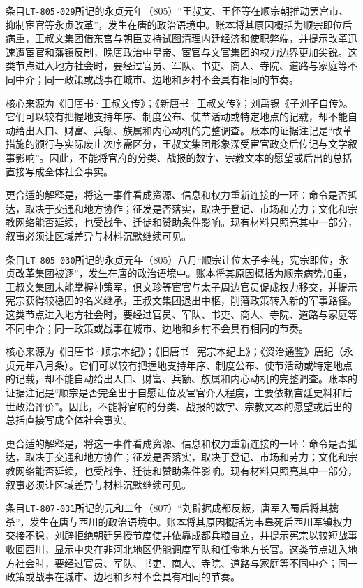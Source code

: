 条目\texttt{LT-805-029}所记的永贞元年（805）“王叔文、王伾等在顺宗朝推动罢宫市、抑制宦官等永贞改革”，发生在唐的政治语境中。账本将其原因概括为顺宗即位后病重，王叔文集团借东宫与朝臣支持试图清理内廷经济和使职弊端，并提示改革迅速遭宦官和藩镇反制，晚唐政治中皇帝、宦官与文官集团的权力边界更加尖锐。这类节点进入地方社会时，要经过官员、军队、书吏、商人、寺院、道路与家庭等不同中介；同一政策或战事在城市、边地和乡村不会具有相同的节奏。

核心来源为《旧唐书·王叔文传》；《新唐书·王叔文传》；刘禹锡《子刘子自传》。它们可以较有把握地支持年序、制度公布、使节活动或特定地点的记载，却不能自动给出人口、财富、兵额、族属和内心动机的完整调查。账本的证据注记是“改革措施的颁行与实际废止次序需区分，王叔文集团形象深受宦官政变后传记与文学叙事影响”。因此，不能将官府的分类、战报的数字、宗教文本的愿望或后出的总括直接写成全体社会事实。

更合适的解释是，将这一事件看成资源、信息和权力重新连接的一环：命令是否抵达，取决于交通和地方协作；征发是否落实，取决于登记、市场和劳力；文化和宗教网络能否延续，也受战争、迁徙和赞助条件影响。现有材料只照亮其中一部分，叙事必须让区域差异与材料沉默继续可见。

条目\texttt{LT-805-030}所记的永贞元年（805）八月“顺宗让位太子李纯，宪宗即位，永贞改革集团被逐”，发生在唐的政治语境中。账本将其原因概括为顺宗病势加重，王叔文集团未能掌握神策军，俱文珍等宦官与太子周边官员促成权力移交，并提示宪宗获得较稳固的名义继承，王叔文集团退出中枢，削藩政策转入新的军事路径。这类节点进入地方社会时，要经过官员、军队、书吏、商人、寺院、道路与家庭等不同中介；同一政策或战事在城市、边地和乡村不会具有相同的节奏。

核心来源为《旧唐书·顺宗本纪》；《旧唐书·宪宗本纪上》；《资治通鉴》唐纪（永贞元年八月条）。它们可以较有把握地支持年序、制度公布、使节活动或特定地点的记载，却不能自动给出人口、财富、兵额、族属和内心动机的完整调查。账本的证据注记是“顺宗是否完全出于自愿让位及宦官介入程度，主要依赖宫廷史料和后世政治评价”。因此，不能将官府的分类、战报的数字、宗教文本的愿望或后出的总括直接写成全体社会事实。

更合适的解释是，将这一事件看成资源、信息和权力重新连接的一环：命令是否抵达，取决于交通和地方协作；征发是否落实，取决于登记、市场和劳力；文化和宗教网络能否延续，也受战争、迁徙和赞助条件影响。现有材料只照亮其中一部分，叙事必须让区域差异与材料沉默继续可见。

条目\texttt{LT-807-031}所记的元和二年（807）“刘辟据成都反叛，唐军入蜀后将其擒杀”，发生在唐与西川的政治语境中。账本将其原因概括为韦皋死后西川军镇权力交接不稳，刘辟拒绝朝廷另授节度使并依靠成都兵粮自立，并提示宪宗以较短战事收回西川，显示中央在非河北地区仍能调度军队和任命地方长官。这类节点进入地方社会时，要经过官员、军队、书吏、商人、寺院、道路与家庭等不同中介；同一政策或战事在城市、边地和乡村不会具有相同的节奏。

